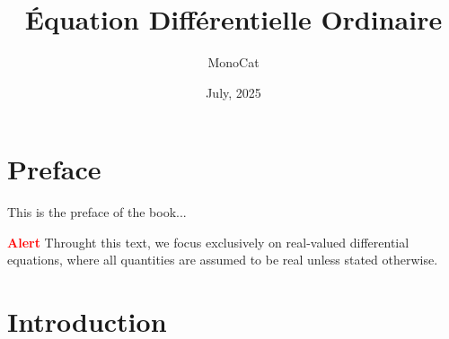 \documentclass[11pt]{elegantbook}
\title{Équation Différentielle Ordinaire} %
\author{MonoCat} %
\date{July, 2025} %
\begin{document}
\maketitle %

\frontmatter        %
\tableofcontents    %

\chapter{Preface}   %
This is the preface of the book...

\textcolor{red}{\bfseries Alert} Throught this text, we focus exclusively on real-valued differential equations, 
where all quantities are assumed to be real unless stated otherwise. 
\mainmatter         %

\chapter{Introduction} %
\end{document}
